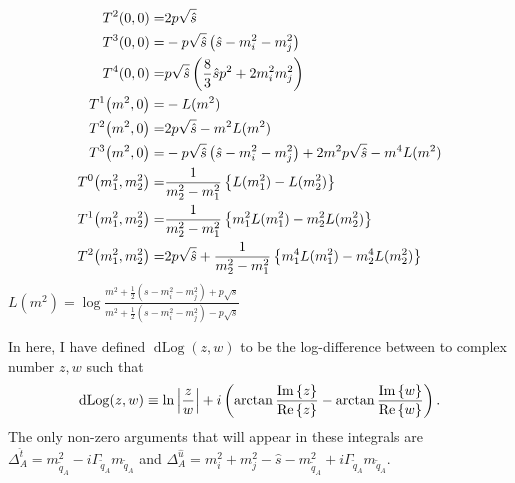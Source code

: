 \documentclass[../main.tex]{subfiles}
\begin{document}
\begin{subequations}
  \begin{align}
    T^2(0, 0) =                   & 2p\sqrt{\hat{s}}
    \\
    T^3(0, 0) =                   &
    -p\sqrt{\hat{s}}\left(\hat{s} - m_i^2 - m_j^2\right)
    \\
    T^4(0, 0) =                   & p\sqrt{\hat{s}}
    \left(\frac{8}{3}\hat{s}p^2 + 2m_i^2m_j^2\right)
    \\
    T^1\!\left(m^2, 0\right) =       & -L(m^2)
    \\
    T^2\!\left(m^2, 0\right) =       & 2p\sqrt{\hat{s}} - m^2 L(m^2)
    \\
    T^3\!\left(m^2, 0\right) =       &
    -p\sqrt{\hat{s}}\left(\hat{s}
      - m_i^2 - m_j^2\right) +
    2m^2p\sqrt{\hat{s}}	- m^4 L(m^2)
    \\
    T^0\!\left(m^2_1, m^2_2\right) = & \frac{1}{m^2_2 - m^2_1}
    \left\{L(m_1^2) - L(m_2^2)\right\}
    \\
    T^1\!\left(m^2_1, m^2_2\right) = & \frac{1}{m^2_2 - m^2_1}
    \left\{m^2_1 L(m_1^2) - m^2_2 L(m_2^2)\right\}
    \\
    \nonumber
    T^2\!\left(m^2_1, m^2_2\right) = & 2p\sqrt{\hat{s}} +
    \frac{1}{m^2_2 - m^2_1} \left\{m^4_1 L(m_1^2) -
      m^4_2 L(m_2^2)\right\}
  \end{align}
\end{subequations}
\(L(m^2) = \log\frac{m^2 + \frac{1}{2}(s-m_i^2-m_j^2) + p\sqrt{s}}{m^2 +
  \frac{1}{2}(s-m_i^2-m_j^2) - p\sqrt{s}}\)

In here, I have defined \(\operatorname{dLog}(z, w)\) to be the log-difference
between to complex number \(z, w\) such that
\begin{equation}
  \operatorname{dLog}(z, w) \equiv \ln\left|\frac{z}{w}\right| +
  i\left(\arctan\frac{\operatorname{Im}\left\{z\right\}}{\operatorname{Re}\left\{z\right\}} - \arctan\frac{\operatorname{Im}\left\{w\right\}}{\operatorname{Re}\left\{w\right\}}\right).
\end{equation}
The only non-zero arguments that will appear in these integrals are
\(\Delta^{\hat{t}}_A = m_{\tilde{q}_A}^2 - i\Gamma_{\tilde{q}_A}
m_{\tilde{q}_A}\) and \(\Delta^{\hat{u}}_A = m_i^2 + m_j^2 - \hat{s} -
m_{\tilde{q}_A}^2 + i\Gamma_{\tilde{q}_A} m_{\tilde{q}_A}\).
\end{document}
